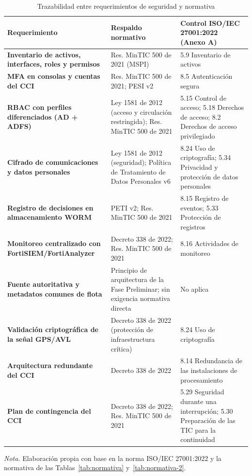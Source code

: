 \begin{table}[H]
	\caption{Trazabilidad entre requerimientos de seguridad y normativa}
	\label{tab:trazabilidad-normativa}
	\centering
	\footnotesize
	\renewcommand{\arraystretch}{1.15}
	\begin{tabularx}{\textwidth}{@{}>{\raggedright\arraybackslash}p{} Y Y@{}}
		\toprule
		\textbf{Requerimiento} & \textbf{Respaldo normativo} & \textbf{Control ISO/IEC 27001:2022 (Anexo A)} \\
		\midrule
		\textbf{Inventario de activos, interfaces, roles y permisos}
		& Res. MinTIC 500 de 2021 (MSPI)
		& 5.9 Inventario de activos
		\\
		\midrule
		\textbf{MFA en consolas y cuentas del CCI}
		& Res. MinTIC 500 de 2021; PESI v2
		& 8.5 Autenticación segura
		\\
		\midrule
		\textbf{RBAC con perfiles diferenciados (AD + ADFS)}
		& Ley 1581 de 2012 (acceso y circulación restringida); Res. MinTIC 500 de 2021
		& 5.15 Control de acceso; 5.18 Derechos de acceso; 8.2 Derechos de acceso privilegiado
		\\
		\midrule
		\textbf{Cifrado de comunicaciones y datos personales}
		& Ley 1581 de 2012 (seguridad); Política de Tratamiento de Datos Personales v6
		& 8.24 Uso de criptografía; 5.34 Privacidad y protección de datos personales
		\\
		\midrule
		\textbf{Registro de decisiones en almacenamiento WORM}
		& PETI v2; Res. MinTIC 500 de 2021
		& 8.15 Registro de eventos; 5.33 Protección de registros
		\\
		\midrule
		\textbf{Monitoreo centralizado con FortiSIEM/FortiAnalyzer}
		& Decreto 338 de 2022; Res. MinTIC 500 de 2021
		& 8.16 Actividades de monitoreo
		\\
		\midrule
		\textbf{Fuente autoritativa y metadatos comunes de flota}
		& Principio de arquitectura de la Fase Preliminar; sin exigencia normativa directa
		& No aplica
		\\
		\midrule
		\textbf{Validación criptográfica de la señal GPS/AVL}
		& Decreto 338 de 2022 (protección de infraestructura crítica)
		& 8.24 Uso de criptografía
		\\
		\midrule
		\textbf{Arquitectura redundante del CCI}
		& Decreto 338 de 2022
		& 8.14 Redundancia de las instalaciones de procesamiento
		\\
		\midrule
		\textbf{Plan de contingencia del CCI}
		& Decreto 338 de 2022; Res. MinTIC 500 de 2021
		& 5.29 Seguridad durante una interrupción; 5.30 Preparación de las TIC para la continuidad
		\\
		\bottomrule
	\end{tabularx}

	\vspace{0.4em}
	\parbox{\textwidth}{\footnotesize \textit{Nota.} Elaboración propia con base en la norma ISO/IEC 27001:2022 \parencite{iso27001} y la normativa de las Tablas~\ref{tab:normativa} y~\ref{tab:normativa-2}.}
\end{table}

